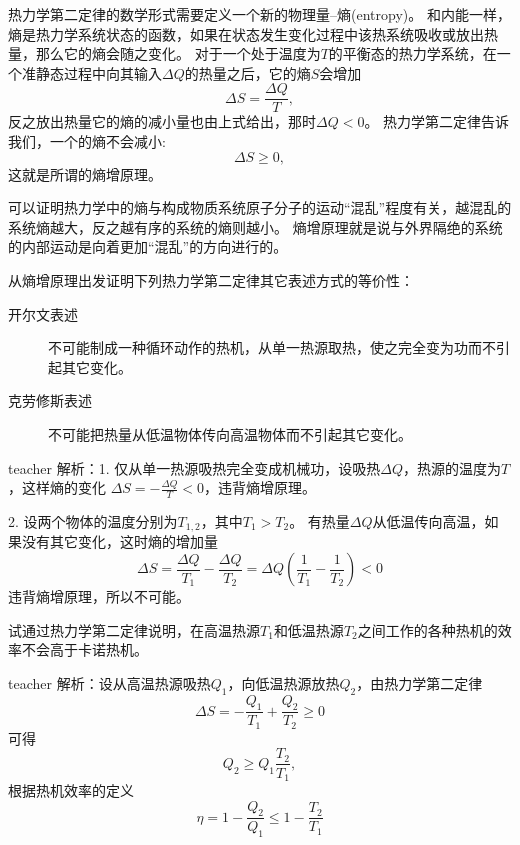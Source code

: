 热力学第二定律的数学形式需要定义一个新的物理量--{\heiti 熵}(entropy)。
和内能一样，熵是热力学系统状态的函数，如果在状态发生变化过程中该热系统吸收或放出热量，那么它的熵会随之变化。 
对于一个处于温度为$T$的平衡态的热力学系统，在一个准静态过程中向其输入$\Delta Q$的热量之后，它的熵$S$会增加
\begin{equation}\label{eqn: thermol 熵增的定义}
\Delta S = \frac{\Delta Q}{T},
\end{equation}
反之放出热量它的熵的减小量也由上式给出，那时$\Delta Q<0$。
热力学第二定律告诉我们，一个的熵不会减小:
\begin{equation}
\Delta S \ge 0,
\end{equation}
这就是所谓的{\heiti 熵增原理}。

可以证明热力学中的熵与构成物质系统原子分子的运动“混乱”程度有关，越混乱的系统熵越大，反之越有序的系统的熵则越小。
熵增原理就是说与外界隔绝的系统的内部运动是向着更加“混乱”的方向进行的。


\begin{example}
从熵增原理出发证明下列热力学第二定律其它表述方式的等价性：
\begin{description}
\item[开尔文表述]不可能制成一种循环动作的热机，从单一热源取热，使之完全变为功而不引起其它变化。
\item[克劳修斯表述]不可能把热量从低温物体传向高温物体而不引起其它变化。
\end{description}
\begin{taggedblock}{teacher}
\noindent
解析：1. 仅从单一热源吸热完全变成机械功，设吸热$\Delta Q$，热源的温度为$T$，这样熵的变化 $\Delta S = -\frac{\Delta Q}{T}<0$，违背熵增原理。

2. 设两个物体的温度分别为$T_{1,2}$，其中$T_1>T_2$。
有热量$\Delta Q$从低温传向高温，如果没有其它变化，这时熵的增加量
\[\Delta S =\frac{\Delta Q}{T_1}-\frac{\Delta Q}{T_2}=\Delta Q \left( \frac{1}{T_1}-\frac{1}{T_2} \right)<0\]
违背熵增原理，所以不可能。
\end{taggedblock}
\end{example}

\begin{example}
试通过热力学第二定律说明，在高温热源$T_1$和低温热源$T_2$之间工作的各种热机的效率不会高于卡诺热机。
\begin{taggedblock}{teacher}
\newline
解析：设从高温热源吸热$Q_1$，向低温热源放热$Q_2$，由热力学第二定律
\[  \Delta S = -\frac{Q_1}{T_1}+\frac{Q_2}{T_2}\ge 0  \]
可得
\[  Q_2 \ge Q_1 \frac{T_2}{T_1}, \]
根据热机效率的定义
\[  \eta = 1-\frac{Q_2}{Q_1}\le 1-\frac{T_2}{T_1}\]
\end{taggedblock}
\end{example}

